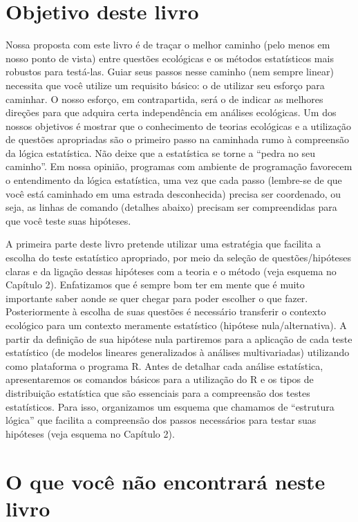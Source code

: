 \documentclass[
]{book}
\begin{document}
\hypertarget{objetivo-deste-livro}{%
\section{Objetivo deste livro}\label{objetivo-deste-livro}}

Nossa proposta com este livro é de traçar o melhor caminho (pelo menos em nosso ponto de vista) entre questões ecológicas e os métodos estatísticos mais robustos para testá-las. Guiar seus passos nesse caminho (nem sempre linear) necessita que você utilize um requisito básico: o de utilizar seu esforço para caminhar. O nosso esforço, em contrapartida, será o de indicar as melhores direções para que adquira certa independência em análises ecológicas. Um dos nossos objetivos é mostrar que o conhecimento de teorias ecológicas e a utilização de questões apropriadas são o primeiro passo na caminhada rumo à compreensão da lógica estatística. Não deixe que a estatística se torne a ``pedra no seu caminho''. Em nossa opinião, programas com ambiente de programação favorecem o entendimento da lógica estatística, uma vez que cada passo (lembre-se de que você está caminhado em uma estrada desconhecida) precisa ser coordenado, ou seja, as linhas de comando (detalhes abaixo) precisam ser compreendidas para que você teste suas hipóteses.

A primeira parte deste livro pretende utilizar uma estratégia que facilita a escolha do teste estatístico apropriado, por meio da seleção de questões/hipóteses claras e da ligação dessas hipóteses com a teoria e o método (veja esquema no Capítulo 2). Enfatizamos que é sempre bom ter em mente que é muito importante saber aonde se quer chegar para poder escolher o que fazer. Posteriormente à escolha de suas questões é necessário transferir o contexto ecológico para um contexto meramente estatístico (hipótese nula/alternativa). A partir da definição de sua hipótese nula partiremos para a aplicação de cada teste estatístico (de modelos lineares generalizados à análises multivariadas) utilizando como plataforma o programa R. Antes de detalhar cada análise estatística, apresentaremos os comandos básicos para a utilização do R e os tipos de distribuição estatística que são essenciais para a compreensão dos testes estatísticos. Para isso, organizamos um esquema que chamamos de ``estrutura lógica'' que facilita a compreensão dos passos necessários para testar suas hipóteses (veja esquema no Capítulo 2).

\hypertarget{o-que-vocuxea-nuxe3o-encontraruxe1-neste-livro}{%
\section{O que você não encontrará neste livro}\label{o-que-vocuxea-nuxe3o-encontraruxe1-neste-livro}}
\end{document}
